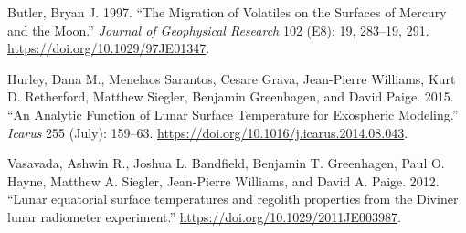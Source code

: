 \documentclass[
    fontsize=10pt,
    twoside=off,
    english,
]{scrbook}
\numberwithin{equation}{chapter}
\theoremstyle{break}
\theoremstyle{nonumberplain}
\begin{document}
\hypertarget{ref}{}

\hypertarget{refs}{}
\begin{CSLReferences}{1}{0}
\leavevmode{}%
Butler, Bryan J. 1997. {``The Migration of Volatiles on the Surfaces of
{M}ercury and the {M}oon.''} \emph{Journal of Geophysical Research} 102
(E8): 19, 283--19, 291. \url{https://doi.org/10.1029/97JE01347}.

\leavevmode{}%
Hurley, Dana M., Menelaos Sarantos, Cesare Grava, Jean-Pierre Williams,
Kurt D. Retherford, Matthew Siegler, Benjamin Greenhagen, and David
Paige. 2015. {``An Analytic Function of Lunar Surface Temperature for
Exospheric Modeling.''} \emph{Icarus} 255 (July): 159--63.
\url{https://doi.org/10.1016/j.icarus.2014.08.043}.

\leavevmode{}%
Vasavada, Ashwin R., Joshua L. Bandfield, Benjamin T. Greenhagen, Paul
O. Hayne, Matthew A. Siegler, Jean-Pierre Williams, and David A. Paige.
2012. {``{Lunar equatorial surface temperatures and regolith properties
from the Diviner lunar radiometer experiment}.''}
\url{https://doi.org/10.1029/2011JE003987}.

\end{CSLReferences}
\end{document}
